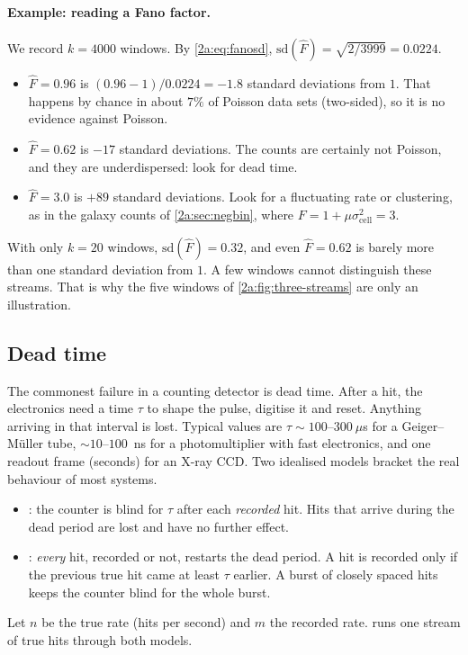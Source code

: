 \paragraph{Example: reading a Fano factor.} We record $k=4000$ windows. By \eqref{2a:eq:fanosd}, $\mathrm{sd}(\hat F)=\sqrt{2/3999}=0.0224$.
\begin{itemize}[leftmargin=1.4em,itemsep=1pt]
  \item $\hat F=0.96$ is $(0.96-1)/0.0224=-1.8$ standard deviations from $1$. That happens by chance in about $7\%$ of Poisson data sets (two-sided), so it is no evidence against Poisson.
  \item $\hat F=0.62$ is $-17$ standard deviations. The counts are certainly not Poisson, and they are underdispersed: look for dead time.
  \item $\hat F=3.0$ is $+89$ standard deviations. Look for a fluctuating rate or clustering, as in the galaxy counts of \cref{2a:sec:negbin}, where $F=1+\mu\sigma^2_{\text{cell}}=3$.
\end{itemize}
With only $k=20$ windows, $\mathrm{sd}(\hat F)=0.32$, and even $\hat F=0.62$ is barely more than one standard deviation from $1$. A few windows cannot distinguish these streams. That is why the five windows of \cref{2a:fig:three-streams} are only an illustration.

\subsection{Dead time}

The commonest failure in a counting detector is dead time. After a hit, the electronics need a time $\tau$ to shape the pulse, digitise it and reset. Anything arriving in that interval is lost. Typical values are $\tau\sim100$--$300~\mu$s for a Geiger--M\"uller tube, $\sim10$--$100$~ns for a photomultiplier with fast electronics, and one readout frame (seconds) for an X-ray CCD. Two idealised models bracket the real behaviour of most systems.
\begin{itemize}[leftmargin=1.4em,itemsep=1pt]
  \item {}: the counter is blind for $\tau$ after each \emph{recorded} hit. Hits that arrive during the dead period are lost and have no further effect.
  \item {}: \emph{every} hit, recorded or not, restarts the dead period. A hit is recorded only if the previous true hit came at least $\tau$ earlier. A burst of closely spaced hits keeps the counter blind for the whole burst.
\end{itemize}
Let $n$ be the true rate (hits per second) and $m$ the recorded rate.  runs one stream of true hits through both models.


